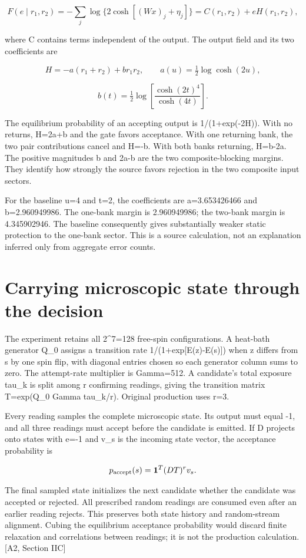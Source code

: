 \[F(e\mid r_1,r_2)=-\sum_j\log\{2\cosh[(Wx)_j+\eta_j]\}=C(r_1,r_2)+eH(r_1,r_2),\]

where C contains terms independent of the output. The output field and its two coefficients are

\[H=-a(r_1+r_2)+br_1r_2,\qquad a(u)=\tfrac12\log\cosh(2u),\]

\[b(t)=\tfrac12\log\!\left[\frac{\cosh(2t)^4}{\cosh(4t)}\right].\]

The equilibrium probability of an accepting output is 1/(1+exp(-2H)). With no returns, H=2a+b and the gate favors acceptance. With one returning bank, the two pair contributions cancel and H=-b. With both banks returning, H=b-2a. The positive magnitudes b and 2a-b are the two composite-blocking margins. They identify how strongly the source favors rejection in the two composite input sectors.

For the baseline u=4 and t=2, the coefficients are a=3.653426466 and b=2.960949986. The one-bank margin is 2.960949986; the two-bank margin is 4.345902946. The baseline consequently gives substantially weaker static protection to the one-bank sector. This is a source calculation, not an explanation inferred only from aggregate error counts.

\section{Carrying microscopic state through the decision}\label{carrying-microscopic-state-through-the-decision}

The experiment retains all 2\^{}7=128 free-spin configurations. A heat-bath generator Q\_0 assigns a transition rate 1/(1+exp{[}E(z)-E(s){]}) when z differs from s by one spin flip, with diagonal entries chosen so each generator column sums to zero. The attempt-rate multiplier is Gamma=512. A candidate's total exposure tau\_k is split among r confirming readings, giving the transition matrix T=exp(Q\_0 Gamma tau\_k/r). Original production uses r=3.

Every reading samples the complete microscopic state. Its output must equal -1, and all three readings must accept before the candidate is emitted. If D projects onto states with e=-1 and v\_s is the incoming state vector, the acceptance probability is

\[p_{\rm accept}(s)=\mathbf1^{T}(DT)^r v_s.\]

The final sampled state initializes the next candidate whether the candidate was accepted or rejected. All prescribed random readings are consumed even after an earlier reading rejects. This preserves both state history and random-stream alignment. Cubing the equilibrium acceptance probability would discard finite relaxation and correlations between readings; it is not the production calculation. {[}A2, Section IIC{]}

